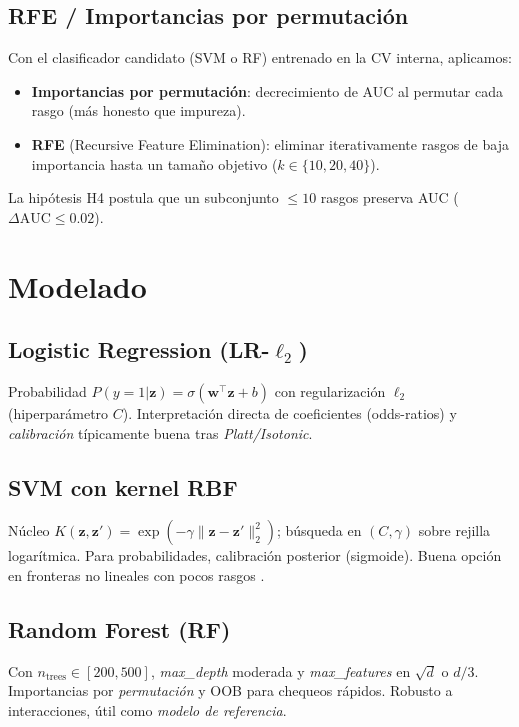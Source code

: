 \subsection{RFE / Importancias por permutación}
Con el clasificador candidato (SVM o RF) entrenado en la CV interna, aplicamos:
\begin{itemize}
\item \textbf{Importancias por permutación}: decrecimiento de AUC al permutar cada rasgo (más honesto que impureza).
\item \textbf{RFE} (Recursive Feature Elimination): eliminar iterativamente rasgos de baja importancia hasta un tamaño objetivo ($k\in\{10,20,40\}$).
\end{itemize}
La hipótesis H4 postula que un subconjunto $\le 10$ rasgos preserva AUC ($\Delta\text{AUC}\le 0.02$).

\section{Modelado}
\label{subsec:modelado}

\subsection{Logistic Regression (LR-$\ell_2$)}
Probabilidad $P(y{=}1|\mathbf{z})=\sigma(\mathbf{w}^\top \mathbf{z}+b)$ con regularización $\ell_2$ (hiperparámetro $C$). Interpretación directa de coeficientes (odds-ratios) y \emph{calibración} típicamente buena tras \emph{Platt/Isotonic}.

\subsection{SVM con kernel RBF}
Núcleo $K(\mathbf{z},\mathbf{z}')=\exp(-\gamma\|\mathbf{z}-\mathbf{z}'\|_2^2)$; búsqueda en $(C,\gamma)$ sobre rejilla logarítmica. Para probabilidades, calibración posterior (sigmoide). Buena opción en fronteras no lineales con pocos rasgos \cite{Tsamardinos2022Patterns}.

\subsection{Random Forest (RF)}
Con $n_\text{trees}\in[200,500]$, \emph{max\_depth} moderada y \emph{max\_features} en $\sqrt{d}$ o $d/3$. Importancias por \emph{permutación} y OOB para chequeos rápidos. Robusto a interacciones, útil como \emph{modelo de referencia}.

